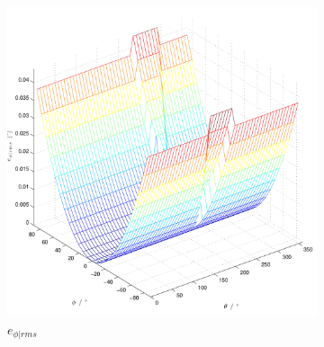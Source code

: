 



\begin{figure}
        \centering
        \begin{subfigure}[b]{0.48\textwidth}
                \centering
                \includegraphics[width=\textwidth]{images/02_Konzeptionierung/angle_error_phi}
                \caption{$e_{\phi | rms}$}
                \label{fig:angle_error_phi}
        \end{subfigure}
        ~ %
        \begin{subfigure}[b]{0.48\textwidth}
                \centering

\end{subfigure}
\end{figure}
